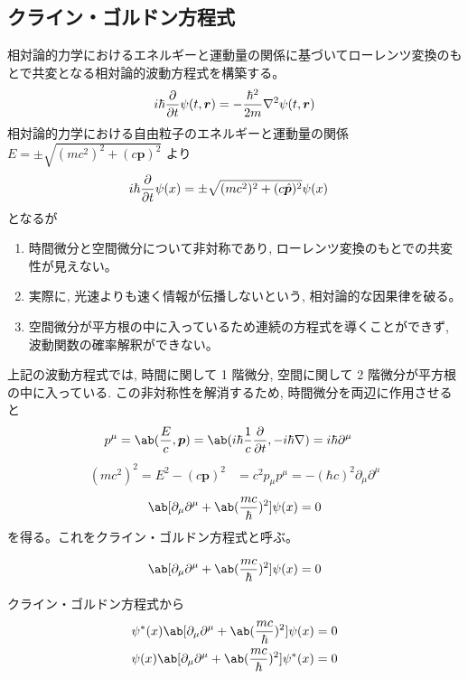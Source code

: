 \documentclass[uplatex,dvipdfmx,a4paper,11pt]{jlreq}
\theoremstyle{definition}
\newcommand{\rr}{\bm{r}}
\newcommand{\pp}{\bm{p}}
\numberwithin{equation}{section}
\begin{document}
\subsection{クライン・ゴルドン方程式}
相対論的力学におけるエネルギーと運動量の関係に基づいてローレンツ変換のもとで共変となる相対論的波動方程式を構築する。
\begin{align}
  i\hbar\diffp{}{t}\psi(t, \rr) = -\frac{\hbar^2}{2m}\nabla^2\psi(t, \rr)
\end{align}
相対論的力学における自由粒子のエネルギーと運動量の関係 $E = \pm\sqrt{(mc^2)^2 + (c\pp)^2}$ より
\begin{align}
  i\hbar\diffp{}{t}\psi(x) & = \pm\sqrt{(mc^2)^2 + (c\hat{\pp})^2}\psi(x)
\end{align}
となるが
\begin{enumerate}
  \item 時間微分と空間微分について非対称であり, ローレンツ変換のもとでの共変性が見えない。
  \item 実際に, 光速よりも速く情報が伝播しないという, 相対論的な因果律を破る。
  \item 空間微分が平方根の中に入っているため連続の方程式を導くことができず, 波動関数の確率解釈ができない。
\end{enumerate}
上記の波動方程式では, 時間に関して 1 階微分, 空間に関して 2 階微分が平方根の中に入っている. この非対称性を解消するため, 時間微分を両辺に作用させると
\begin{align}
  p^\mu & = \ab(\frac{E}{c}, \pp) = \ab(i\hbar\frac{1}{c}\diffp{}{t}, -i\hbar\nabla) = i\hbar\partial^\mu
\end{align}
\begin{align}
  (mc^2)^2 = E^2 - (c\pp)^2 & = c^2p_\mu p^\mu = -(\hbar c)^2\partial_\mu\partial^\mu
\end{align}
\begin{align}
  \ab[\partial_\mu\partial^\mu + \ab(\frac{mc}{\hbar})^2]\psi(x) = 0
\end{align}
を得る。これをクライン・ゴルドン方程式と呼ぶ。
\begin{definition}
  \begin{align}
    \ab[\partial_\mu\partial^\mu + \ab(\frac{mc}{\hbar})^2]\psi(x) = 0
  \end{align}
\end{definition}
クライン・ゴルドン方程式から
\begin{align}
  \psi^*(x)\ab[\partial_\mu\partial^\mu + \ab(\frac{mc}{\hbar})^2]\psi(x) = 0 \\
  \psi(x)\ab[\partial_\mu\partial^\mu + \ab(\frac{mc}{\hbar})^2]\psi^*(x) = 0
\end{align}
\end{document}
